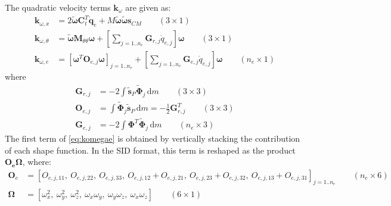 \documentclass[wes, manuscript]{copernicus}
\renewcommand{\d}{\mathrm{d}}
\renewcommand{\v}[1]{\boldsymbol{#1}}
\newcommand{\m}[1]{\boldsymbol{#1}}
\newcommand{\M} {{\m{M}}}
\newcommand{\stil}  {\m{\tilde{s}}}
\renewcommand{\d}{\mathrm{d}}
\newcommand{\dm}{\d{m}}
\begin{document}
The quadratic velocity terms $\v{k}_\omega$  are given as:
\begin{align}
  \v{k}_{\omega, x}       & = 2\v{\tilde{\omega}}  \v{C}_t^T \v{\dot{q}}_e
      + 
M\v{\tilde{\omega}} 
 \v{\tilde{\omega}} 
\v{s}_{CM}
 \qquad (3\times 1)
  \\
  \v{k}_{\omega, \theta}  & = \v{\tilde{\omega}}\M_{\theta\theta}\v{\omega}         
   +\left[\sum\limits_{j=1..n_e}  \v{G}_{r,j} \dot{q}_{e,j}\right] \v{\omega}
 \qquad (3\times 1)
  \\
  \v{k}_{\omega, e}   & =  \left[  \v{\omega}^T \m{O}_{e,j}\v{\omega}\right]_{j=1..n_e} 
  + 
    \left[\sum\limits_{j=1..n_e}   \m{G}_{e,j} \dot{q}_{e,j}\right] \v{\omega}
 \qquad (n_e\times 1)
 \label{eq:komegae}
\end{align}
where
\begin{align}
    \m{G}_{r,j} &=  -2 \int   \stil_P \m{\tilde{\Phi}}_j \,\dm \qquad (3\times 3) 
        \\
    \m{O}_{e,j} &=  \int  \m{\tilde{\Phi}}_j \stil_P\,\dm = -\frac{1}{2}  \m{G}_{r,j}^T  \qquad (3\times 3) 
    \\
    \m{G}_{e,j} &=  -2 \int  \m{\Phi}^T \m{\tilde{\Phi}}_j \,\dm \qquad (n_e\times 3) 
\end{align}
The first term of \autoref{eq:komegae} is obtained by vertically stacking the contribution of each shape function. 
In the SID format, this term is reshaped as the product $\m{O_e}\v{\Omega}$, where: 
\begin{align}
  \m{O}_e &= \left[O_{e,j,11},\ O_{e,j,22},\  O_{e,j,33},\ O_{e,j,12}+O_{e,j,21},\ O_{e,j,23}+O_{e,j,32},\ O_{e,j,13}+O_{e,j,31}\right]_{j=1..n_e}  \qquad (n_e\times 6)
       \\
 \v{\Omega} &=  \left[\omega_x^2,\ \omega_y^2,\ \omega_z^2,\ \omega_x \omega_y,\ \omega_y \omega_z,\ \omega_x \omega_z \right] \qquad (6\times 1)
\end{align}
\end{document}
